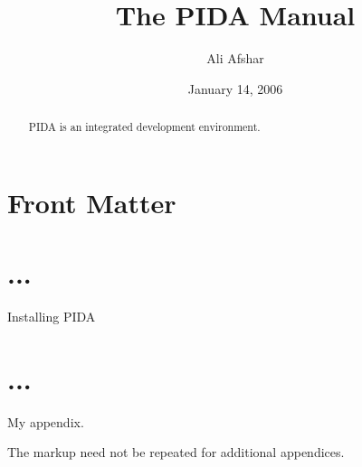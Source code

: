 \documentclass{manual}
\title{The PIDA Manual}
\author{Ali Afshar}
\date{January 14, 2006}		%
\begin{document}
\maketitle

\ifhtml
\chapter*{Front Matter\label{front}}
\fi

%

\begin{abstract}

\noindent
PIDA is an integrated development environment.

\end{abstract}

\tableofcontents


\chapter{...}

Installing PIDA


\appendix
\chapter{...}

My appendix.

The  markup need not be repeated for additional
appendices.
\end{document}
